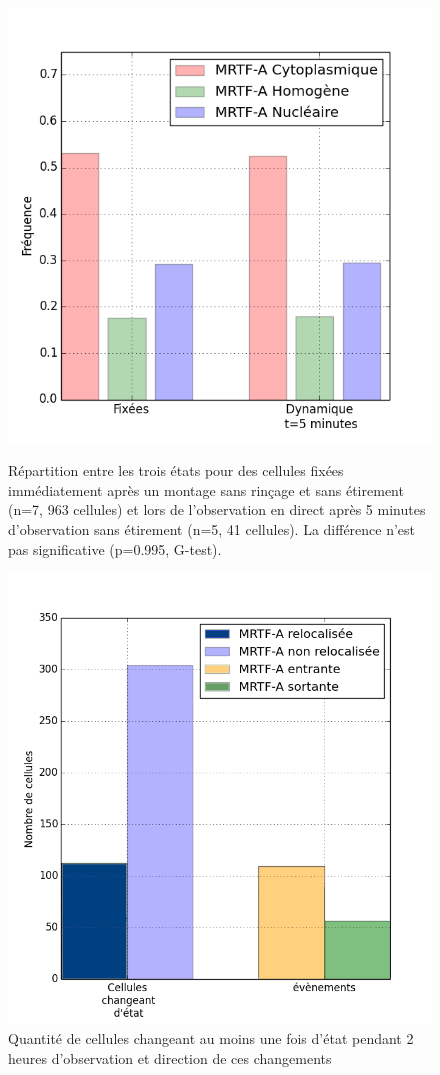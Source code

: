 \begin{figure}
\includegraphics[scale=0.5]{Figures/Reference.png} 
\caption{Répartition entre les trois états pour des cellules fixées immédiatement après un montage sans rinçage et sans étirement (n=7, 963 cellules) et lors de l'observation en direct après 5 minutes d'observation sans étirement (n=5, 41 cellules). La différence n'est pas significative (p=0.995, G-test).
\label{Référence}}
\includegraphics[scale=0.4]{Figures/Reference_transloc.png} 
\caption{Quantité de cellules changeant au moins une fois d'état pendant 2 heures d'observation et direction de ces changements \label{Ref_transloc}}
\end{figure}

